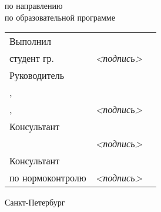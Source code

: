\vspace{0pt plus2fill} %


{\centering%
	
	\MakeUppercase{\bfseries{}\DocType} %
	\MakeUppercase{\thesisDegree}%


\intervalS%
{\centering%
	\MakeUppercase{\bfseries{\thesisTitle}}}%

}\par%
{\centering%
\intervalS%
	по направлению  \thesisSpecialtyCodeAndTitle{}\\%
по образовательной программе\\


\thesisOPCodeAndTitle %
\par%
}\par%




\vspace{4mm plus2fill}%

\noindent
\begin{tabularx}{\linewidth}{lXl}
	Выполнил              &	   &             \\
	студент гр.~\group     & \emph{<подпись>}   & \Author     \\[\mfloatsep]

	Руководитель 		  &    &             \\
	\SupervisorJob,		  &    &             \\
	\SupervisorDegree, \SupervisorTitle 	  &  \emph{<подпись>}  & \Supervisor \\[\mfloatsep]
	
	Консультант	  &    & 			 \\
	\ConsultantExtraDegree 	  &  \emph{<подпись>}  & \ConsultantExtra\\[\mfloatsep]
	
	Консультант  &    &  \\   	
	по нормоконтролю  		 	  & \emph{<подпись>}   & \ConsultantNorm  %
\end{tabularx} %


%
\vspace{0pt plus4fill}%


\begin{center}%
Санкт-Петербург\\
\thesisYear
\end{center}%
\restoregeometry
\newpage
